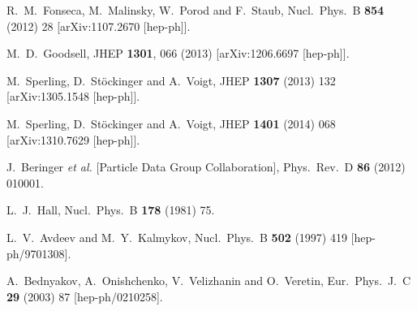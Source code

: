 \documentclass[final,3p,11pt,pdflatex]{elsarticle}
\begin{document}
\begin{thebibliography}{100}
  R.~M.~Fonseca, M.~Malinsky, W.~Porod and F.~Staub,
  Nucl.\ Phys.\ B {\bf 854} (2012) 28
  [arXiv:1107.2670 [hep-ph]].

  M.~D.~Goodsell,
  JHEP {\bf 1301}, 066 (2013)
  [arXiv:1206.6697 [hep-ph]].

  M.~Sperling, D.~Stöckinger and A.~Voigt,
  JHEP {\bf 1307} (2013) 132
  [arXiv:1305.1548 [hep-ph]].

  M.~Sperling, D.~Stöckinger and A.~Voigt,
  JHEP {\bf 1401} (2014) 068
  [arXiv:1310.7629 [hep-ph]].




  J.~Beringer {\it et al.}  [Particle Data Group Collaboration],
  Phys.\ Rev.\ D {\bf 86} (2012) 010001.

  L.~J.~Hall,
  Nucl.\ Phys.\ B {\bf 178} (1981) 75.

  L.~V.~Avdeev and M.~Y.~Kalmykov,
  Nucl.\ Phys.\ B {\bf 502} (1997) 419
  [hep-ph/9701308].

  A.~Bednyakov, A.~Onishchenko, V.~Velizhanin and O.~Veretin,
  Eur.\ Phys.\ J.\ C {\bf 29} (2003) 87
  [hep-ph/0210258].


\end{thebibliography}
\end{document}
